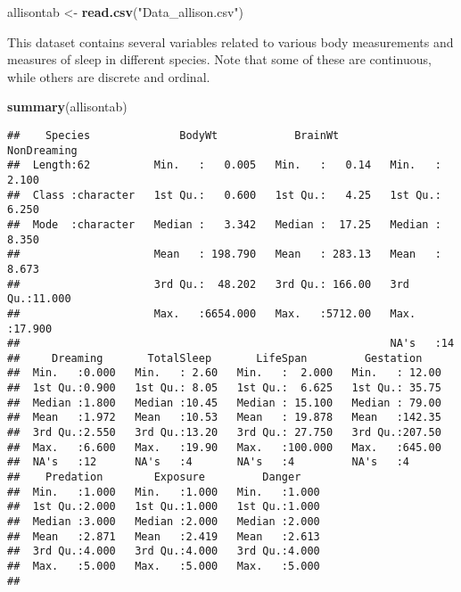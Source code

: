 \documentclass[
]{book}
\newenvironment{Shaded}{\begin{snugshade}}{\end{snugshade}}
\newcommand{\KeywordTok}[1]{\textcolor[rgb]{0.13,0.29,0.53}{\textbf{#1}}}
\newcommand{\NormalTok}[1]{#1}
\newcommand{\StringTok}[1]{\textcolor[rgb]{0.31,0.60,0.02}{#1}}
\begin{document}
\begin{Shaded}
\begin{Highlighting}[]
\NormalTok{allisontab \textless{}{-}}\StringTok{ }\KeywordTok{read.csv}\NormalTok{(}\StringTok{"Data\_allison.csv"}\NormalTok{)}
\end{Highlighting}
\end{Shaded}

This dataset contains several variables related to various body measurements and measures of sleep in different species. Note that some of these are continuous, while others are discrete and ordinal.

\begin{Shaded}
\begin{Highlighting}[]
\KeywordTok{summary}\NormalTok{(allisontab)}
\end{Highlighting}
\end{Shaded}

\begin{verbatim}
##    Species              BodyWt            BrainWt         NonDreaming    
##  Length:62          Min.   :   0.005   Min.   :   0.14   Min.   : 2.100  
##  Class :character   1st Qu.:   0.600   1st Qu.:   4.25   1st Qu.: 6.250  
##  Mode  :character   Median :   3.342   Median :  17.25   Median : 8.350  
##                     Mean   : 198.790   Mean   : 283.13   Mean   : 8.673  
##                     3rd Qu.:  48.202   3rd Qu.: 166.00   3rd Qu.:11.000  
##                     Max.   :6654.000   Max.   :5712.00   Max.   :17.900  
##                                                          NA's   :14      
##     Dreaming       TotalSleep       LifeSpan         Gestation     
##  Min.   :0.000   Min.   : 2.60   Min.   :  2.000   Min.   : 12.00  
##  1st Qu.:0.900   1st Qu.: 8.05   1st Qu.:  6.625   1st Qu.: 35.75  
##  Median :1.800   Median :10.45   Median : 15.100   Median : 79.00  
##  Mean   :1.972   Mean   :10.53   Mean   : 19.878   Mean   :142.35  
##  3rd Qu.:2.550   3rd Qu.:13.20   3rd Qu.: 27.750   3rd Qu.:207.50  
##  Max.   :6.600   Max.   :19.90   Max.   :100.000   Max.   :645.00  
##  NA's   :12      NA's   :4       NA's   :4         NA's   :4       
##    Predation        Exposure         Danger     
##  Min.   :1.000   Min.   :1.000   Min.   :1.000  
##  1st Qu.:2.000   1st Qu.:1.000   1st Qu.:1.000  
##  Median :3.000   Median :2.000   Median :2.000  
##  Mean   :2.871   Mean   :2.419   Mean   :2.613  
##  3rd Qu.:4.000   3rd Qu.:4.000   3rd Qu.:4.000  
##  Max.   :5.000   Max.   :5.000   Max.   :5.000  
## 
\end{verbatim}
\end{document}
